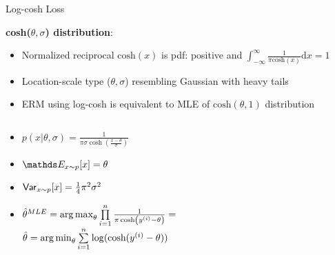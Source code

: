 \documentclass[11pt,compress,t,notes=noshow, xcolor=table]{beamer}
\begin{document}
\begin{vbframe}{Log-cosh Loss }

\textbf{cosh($\theta,\sigma$) distribution}:\\

\begin{itemize}

\item Normalized reciprocal $\text{cosh}(x)$ is pdf: 
positive and $\int_{-\infty}^{\infty} \frac{1}{\pi \text{cosh}(x)} \text{d}x = 1$

\item Location-scale type ($\theta, \sigma$) 
resembling Gaussian with heavy tails

\item ERM using log-cosh 
is equivalent to MLE of $\text{cosh}(\theta,1)$ distribution

\end{itemize}

\begin{columns}

\begin{column}{0.5\textwidth}

{\normalsize 
\begin{itemize}\setlength{\itemsep}{0.32em}
    \item $p(x | \theta, \sigma)=\frac{1}{\pi \sigma \cosh \left(\frac{x-\theta}{\sigma}\right)}$
    \item $\E_{x \sim p}[x] = \theta$
    \item $\mathsf{Var}_{x \sim p}[x]=\frac{1}{4} \pi^2 \sigma^2 $
    \item {\footnotesize $\hat{\theta}^{MLE}=\mathop{\mathrm{arg\,max}}_{\theta} \prod\limits_{i=1}^n \frac{1}{\pi \cosh \left(y^{(i)}-\theta\right)} =$}\\{\footnotesize $\hat{\theta} = \mathop{\mathrm{arg\,min}}_{\theta}\sum\limits_{i=1}^n \log(\text{cosh}(y^{(i)}-\theta))$}
\end{itemize}
}
\end{column}

\begin{column}{0.7\textwidth}

\begin{figure}
      \centering
    \end{figure}

\end{column}

\end{columns}


\end{vbframe}
\end{document}
